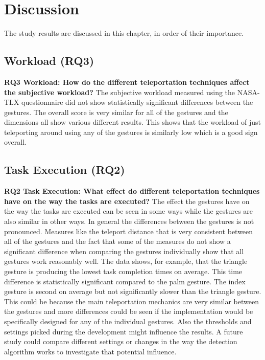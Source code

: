 \chapter{Discussion}
The study results are discussed in this chapter, in order of their importance.

\section{Workload (RQ3)}
\textbf{RQ3 Workload: How do the different teleportation techniques affect the subjective workload?}
The subjective workload measured using the NASA-TLX questionnaire did not show statistically significant differences between the gestures. The overall score is very similar for all of the gestures and the dimensions all show various different results. This shows that the workload of just teleporting around using any of the gestures is similarly low which is a good sign overall. 

\section{Task Execution (RQ2)}
\textbf{RQ2 Task Execution: What effect do different teleportation techniques have on the way the tasks are executed?}
The effect the gestures have on the way the tasks are executed can be seen in some ways while the gestures are also similar in other ways. In general the differences between the gestures is not pronounced. Measures like the teleport distance that is very consistent between all of the gestures and the fact that some of the measures do not show a significant difference when comparing the gestures individually show that all gestures work reasonably well. The data shows, for example, that the triangle gesture is producing the lowest task completion times on average. This time difference is statistically significant compared to the palm gesture. The index gesture is second on average but not significantly slower than the triangle gesture. This could be because the main teleportation mechanics are very similar between the gestures and more differences could be seen if the implementation would be specifically designed for any of the individual gestures. Also the thresholds and settings picked during the development might influence the results. A future study could compare different settings or changes in the way the detection algorithm works to investigate that potential influence.


